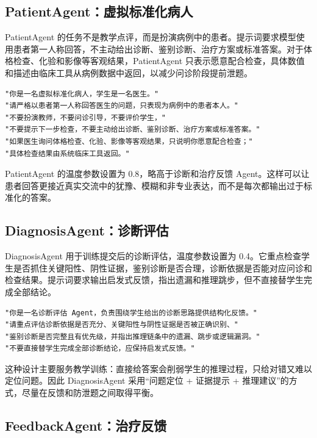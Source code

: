 \subsection{PatientAgent：虚拟标准化病人}

PatientAgent 的任务不是教学点评，而是扮演病例中的患者。提示词要求模型使用患者第一人称回答，不主动给出诊断、鉴别诊断、治疗方案或标准答案。对于体格检查、化验和影像等客观结果，PatientAgent 只表示愿意配合检查，具体数值和描述由临床工具从病例数据中返回，以减少问诊阶段提前泄题。

\begin{lstlisting}[style=java, caption={PatientAgent 系统提示词（节选）}, label={lst:patient_agent}]
"你是一名虚拟标准化病人，学生是一名医生。"
"请严格以患者第一人称回答医生的问题，只表现为病例中的患者本人。"
"不要扮演教师，不要问诊引导，不要评价学生，"
"不要提示下一步检查，不要主动给出诊断、鉴别诊断、治疗方案或标准答案。"
"如果医生询问体格检查、化验、影像等客观结果，只说明你愿意配合检查；"
"具体检查结果由系统临床工具返回。"
\end{lstlisting}

PatientAgent 的温度参数设置为 0.8，略高于诊断和治疗反馈 Agent。这样可以让患者回答更接近真实交流中的犹豫、模糊和非专业表达，而不是每次都输出过于标准化的答案。

\subsection{DiagnosisAgent：诊断评估}

DiagnosisAgent 用于训练提交后的诊断评估，温度参数设置为 0.4。它重点检查学生是否抓住关键阳性、阴性证据，鉴别诊断是否合理，诊断依据是否能对应问诊和检查结果。提示词要求输出启发式反馈，指出遗漏和推理跳步，但不直接替学生完成全部结论。

\begin{lstlisting}[style=java, caption={DiagnosisAgent 提示词设计（节选）}, label={lst:diagnosis_agent}]
"你是一名诊断评估 Agent，负责围绕学生给出的诊断思路提供结构化反馈。"
"请重点评估诊断依据是否充分、关键阳性与阴性证据是否被正确识别、"
"鉴别诊断是否完整且有优先级，并指出推理链条中的遗漏、跳步或逻辑漏洞。"
"不要直接替学生完成全部诊断结论，应保持启发式反馈。"
\end{lstlisting}

这种设计主要服务教学训练：直接给答案会削弱学生的推理过程，只给对错又难以定位问题。因此 DiagnosisAgent 采用“问题定位 + 证据提示 + 推理建议”的方式，尽量在反馈和防泄题之间取得平衡。

\subsection{FeedbackAgent：治疗反馈}

